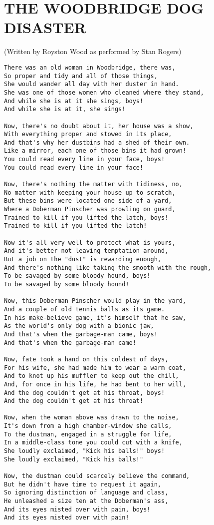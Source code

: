 \documentclass[leqno]{memoir}
\begin{document}
\chapter{THE WOODBRIDGE DOG DISASTER}
(Written by Royston Wood as performed by Stan Rogers)
\begin{verbatim}
There was an old woman in Woodbridge, there was,
So proper and tidy and all of those things,
She would wander all day with her duster in hand.
She was one of those women who cleaned where they stand,
And while she is at it she sings, boys!
And while she is at it, she sings!

Now, there's no doubt about it, her house was a show,
With everything proper and stowed in its place,
And that's why her dustbins had a shed of their own.
Like a mirror, each one of those bins it had grown!
You could read every line in your face, boys!
You could read every line in your face!

Now, there's nothing the matter with tidiness, no,
No matter with keeping your house up to scratch,
But these bins were located one side of a yard,
Where a Doberman Pinscher was prowling on guard,
Trained to kill if you lifted the latch, boys!
Trained to kill if you lifted the latch!

Now it's all very well to protect what is yours,
And it's better not leaving temptation around,
But a job on the "dust" is rewarding enough,
And there's nothing like taking the smooth with the rough,
To be savaged by some bloody hound, boys!
To be savaged by some bloody hound!

Now, this Doberman Pinscher would play in the yard,
And a couple of old tennis balls as its game.
In his make-believe game, it's himself that he saw,
As the world's only dog with a bionic jaw,
And that's when the garbage-man came, boys!
And that's when the garbage-man came!

Now, fate took a hand on this coldest of days,
For his wife, she had made him to wear a warm coat,
And to knot up his muffler to keep out the chill,
And, for once in his life, he had bent to her will,
And the dog couldn't get at his throat, boys!
And the dog couldn't get at his throat!

Now, when the woman above was drawn to the noise,
It's down from a high chamber-window she calls,
To the dustman, engaged in a struggle for life,
In a middle-class tone you could cut with a knife,
She loudly exclaimed, "Kick his balls!" boys!
She loudly exclaimed, "Kick his balls!"

Now, the dustman could scarcely believe the command,
But he didn't have time to request it again,
So ignoring distinction of language and class,
He unleashed a size ten at the Doberman's ass,
And its eyes misted over with pain, boys!
And its eyes misted over with pain!


\end{verbatim}
\end{document}
